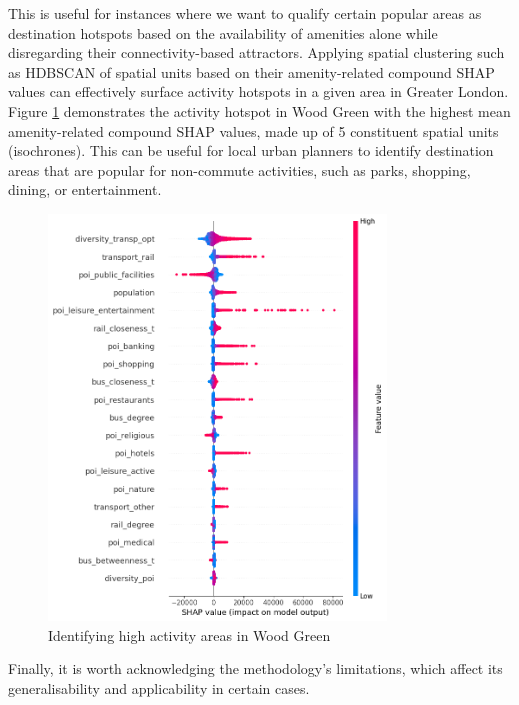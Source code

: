 This is useful for instances where we want to qualify certain popular areas as destination hotspots based on the availability of amenities alone while disregarding their connectivity-based attractors. Applying spatial clustering such as HDBSCAN of spatial units based on their amenity-related compound SHAP values can effectively surface activity hotspots in a given area in Greater London. Figure \ref{fig:woodgreen} demonstrates the activity hotspot in Wood Green with the highest mean amenity-related compound SHAP values, made up of 5 constituent spatial units (isochrones). This can be useful for local urban planners to identify destination areas that are popular for non-commute activities, such as parks, shopping, dining, or entertainment.

\begin{figure}[!ht]
    \centering
    \includegraphics[width=0.8\textwidth]{output.png}
    \captionsetup{justification=centering}
    \caption{Identifying high activity areas in Wood Green}
    \label{fig:woodgreen}
\end{figure}

Finally, it is worth acknowledging the methodology's limitations, which affect its generalisability and applicability in certain cases.

